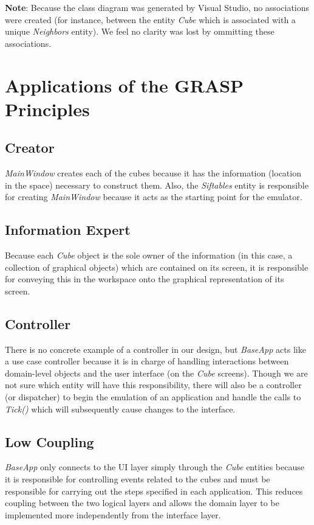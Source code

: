 \documentclass[12pt]{article}
\begin{document}


\textbf{Note}: Because the class diagram was generated by Visual Studio, no associations were created (for instance, between the entity \textit{Cube} which is associated with a unique \textit{Neighbors} entity). We feel no clarity was lost by ommitting these associations.

\section{Applications of the GRASP Principles}

\subsection{Creator}
\textit{MainWindow} creates each of the cubes because it has the information (location in the space) necessary to construct them. Also, the \textit{Siftables} entity is responsible for creating \textit{MainWindow} because it acts as the starting point for the emulator.

\subsection{Information Expert}
Because each \textit{Cube} object is the sole owner of the information (in this case, a collection of graphical objects) which are contained on its screen, it is responsible for conveying this in the workspace onto the graphical representation of its screen.

\subsection{Controller}
There is no concrete example of a controller in our design, but \textit{BaseApp} acts like a use case controller because it is in charge of handling interactions between domain-level objects and the user interface (on the \textit{Cube} screens). Though we are not sure which entity will have this responsibility, there will also be a controller (or dispatcher) to begin the emulation of an application and handle the calls to \textit{Tick()} which will subsequently cause changes to the interface.

\subsection{Low Coupling}
\textit{BaseApp} only connects to the UI layer simply through the \textit{Cube} entities because it is responsible for controlling events related to the cubes and must be responsible for carrying out the steps specified in each application. This reduces coupling between the two logical layers and allows the domain layer to be implemented more independently from the interface layer.
\end{document}
